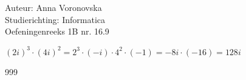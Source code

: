 \documentclass[a4paper]{article}
\begin{document}
  
\noindent \large Auteur: Anna Voronovska \\
\noindent \large Studierichting: Informatica\\
\noindent \large Oefeningenreeks 1B nr. 16.9\\

\medskip

\normalsize


$(2i)^3 \cdot (4i)^2=2^3 \cdot(-i) \cdot4^2
\cdot(-1)=-8i \cdot (-16)=128i$


\begin{thebibliography}{999}
\end{thebibliography}
\end{document}
